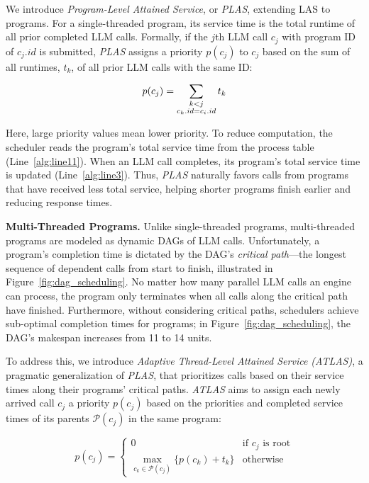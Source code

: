 We introduce \textit{Program-Level Attained Service}, or \textit{PLAS}, extending LAS to programs. For a single-threaded program, its service time is the total runtime of all prior completed LLM calls. Formally, if the $j$th LLM call $c_j$ with program ID of $c_{j}.id$ is submitted, \textit{PLAS} assigns a priority $p(c_j)$ to $c_j$ based on the sum of all runtimes, $t_k$, of all prior LLM calls with the same ID:

\vspace{-2mm}
\begin{equation}
\label{equation:plas}
p(c_j) = \sum_{\substack{k < j \\ c_{k}.id = c_{i}.id}} t_k
\vspace{-2mm}
\end{equation}

\noindent Here, large priority values mean lower priority. To reduce computation, the scheduler reads the program’s total service time from the process table (Line~\ref{alg:line11}). When an LLM call completes, its program’s total service time is updated (Line~\ref{alg:line3}). Thus, \textit{PLAS} naturally favors calls from programs that have received less total service, helping shorter programs finish earlier and reducing response times.

\vspace{1.5mm}
\noindent \textbf{Multi-Threaded Programs.} Unlike single-threaded programs, multi-threaded programs are modeled as dynamic DAGs of LLM calls. Unfortunately, a program’s completion time is dictated by the DAG's \emph{critical path}—the longest sequence of dependent calls from start to finish, illustrated in Figure~\ref{fig:dag_scheduling}. No matter how many parallel LLM calls an engine can process, the program only terminates when all calls along the critical path have finished. Furthermore, without considering critical paths, schedulers achieve sub-optimal completion times for programs; in Figure~\ref{fig:dag_scheduling}, the DAG's makespan increases from 11 to 14 units. 

To address this, we introduce \textit{Adaptive Thread-Level Attained Service (ATLAS)}, a pragmatic generalization of \textit{PLAS}, that prioritizes calls based on their service times along their programs' critical paths. \textit{ATLAS} aims to assign each newly arrived call \( c_j \) a priority \( p(c_j) \) based on the priorities and completed service times of its parents \(\mathcal{P}(c_j)\) in the same program:

\vspace{-5mm}
\begin{equation}
\label{equation:atlas}
p(c_j) = 
\begin{cases} 
0 & \text{if } c_j \text{ is root} \\
\max_{c_k \in \mathcal{P}(c_j)} \{ p(c_k) + t_k \} & \text{otherwise}
\end{cases}
\end{equation}

